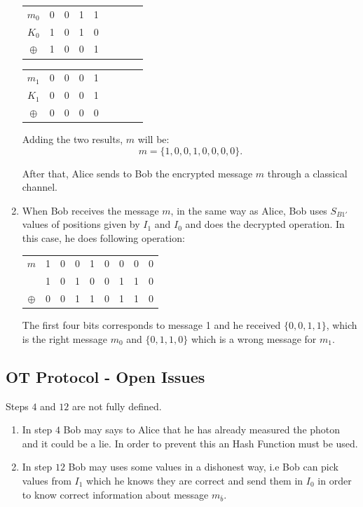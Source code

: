 \begin{enumerate}
   \begin{table}[H]
    \centering
    \begin{tabular}{c|c c c c c c c c}
     $m_{0}$ & 0 & 0 & 1 & 1 \\
     $K_{0}$ & 1 & 0 & 1 & 0 \\ \hline
     $\oplus$ & 1 & 0 & 0 & 1
    \end{tabular}
    \end{table}

   \begin{table}[H]
    \centering
    \begin{tabular}{c|c c c c c c c c}
     $m_{1}$ & 0 & 0 & 0 & 1 \\
     $K_{1}$ & 0 & 0 & 0 & 1 \\ \hline
     $\oplus$ & 0 & 0 & 0 & 0
    \end{tabular}
    \end{table}

    Adding the two results, $m$ will be: $$m=\{1,0,0,1,0,0,0,0\}.$$

   After that, Alice sends to Bob the encrypted message $m$ through a classical channel.

  \item When Bob receives the message $m$, in the same way as Alice, Bob uses $S_{B1\prime}$ values of positions given by $I_{1}$ and $I_{0}$ and does the decrypted operation. In this case, he does following operation:

      \begin{table}[H]
        \centering
        \begin{tabular}{c|c c c c c c c c}
         $m$ & 1 & 0 & 0 & 1 & 0 & 0 & 0 & 0 \\
             & 1 & 0 & 1 & 0 & 0 & 1 & 1 & 0 \\ \hline
         $\oplus$ & 0 & 0 & 1 & 1 & 0 & 1 & 1 & 0 \\
        \end{tabular}
        \end{table}

      The first four bits corresponds to message 1 and he received $\{0,0,1,1\}$, which is the right message $m_{0}$ and $\{0,1,1,0\}$ which is a wrong message for $m_{1}$.


\end{enumerate}

\subsection{OT Protocol - Open Issues}
Steps $4$ and $12$ are not fully defined.
\begin{enumerate}
  \item In step $4$ Bob may says to Alice that he has already measured the photon and it could be a lie. In order to prevent this an Hash Function must be used.

  \item In step $12$ Bob may uses some values in a dishonest way, i.e Bob can pick values from $I_{1}$ which he knows they are correct and send them in $I_{0}$ in order to know correct information about message $m_{\bar{b}}$.
\end{enumerate}


